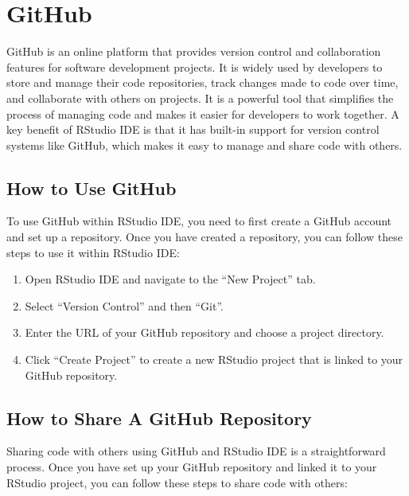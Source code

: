 \documentclass[
]{book}
\providecommand{\tightlist}{%
  \setlength{\itemsep}{0pt}\setlength{\parskip}{0pt}}
\begin{document}
\hypertarget{github}{%
\section{GitHub}\label{github}}

GitHub is an online platform that provides version control and collaboration features for software development projects. It is widely used by developers to store and manage their code repositories, track changes made to code over time, and collaborate with others on projects. It is a powerful tool that simplifies the process of managing code and makes it easier for developers to work together. A key benefit of RStudio IDE is that it has built-in support for version control systems like GitHub, which makes it easy to manage and share code with others.

\hypertarget{how-to-use-github}{%
\subsection*{How to Use GitHub}\label{how-to-use-github}}

To use GitHub within RStudio IDE, you need to first create a GitHub account and set up a repository. Once you have created a repository, you can follow these steps to use it within RStudio IDE:

\begin{enumerate}
\def\labelenumi{\arabic{enumi}.}
\tightlist
\item
  Open RStudio IDE and navigate to the ``New Project'' tab.
\item
  Select ``Version Control'' and then ``Git''.
\item
  Enter the URL of your GitHub repository and choose a project directory.
\item
  Click ``Create Project'' to create a new RStudio project that is linked to your GitHub repository.
\end{enumerate}

\hypertarget{how-to-share-a-github-repository}{%
\subsection*{How to Share A GitHub Repository}\label{how-to-share-a-github-repository}}

Sharing code with others using GitHub and RStudio IDE is a straightforward process. Once you have set up your GitHub repository and linked it to your RStudio project, you can follow these steps to share code with others:
\end{document}
